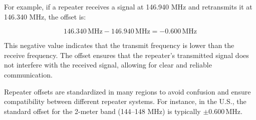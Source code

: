 For example, if a repeater receives a signal at 146.940 MHz and retransmits it at 146.340 MHz, the offset is:  

\[
146.340 \, \text{MHz} - 146.940 \, \text{MHz} = -0.600 \, \text{MHz}
\]

This negative value indicates that the transmit frequency is lower than the receive frequency. The offset ensures that the repeater’s transmitted signal does not interfere with the received signal, allowing for clear and reliable communication.  

Repeater offsets are standardized in many regions to avoid confusion and ensure compatibility between different repeater systems. For instance, in the U.S., the standard offset for the 2-meter band (144–148 MHz) is typically \(\pm 0.600 \, \text{MHz}\).  

